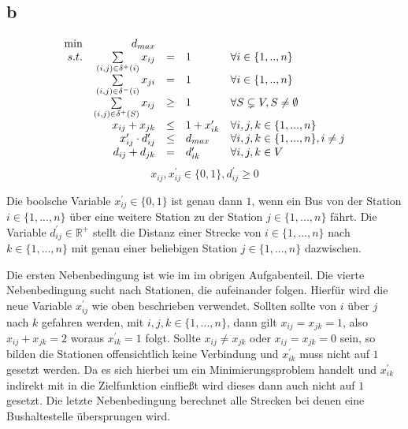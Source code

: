 \documentclass[10pt]{article}
\begin{document}
    \subsection*{b}
      \begin{displaymath}
        \begin{array}{ r r c l l }
          \min & d_{max} & & & \\
          s.t. & \sum\limits_{(i,j)\in \delta^{+}(i)} x_{ij} & = & 1 & \forall 
            i\in \{1,..,n\}\\
               & \sum\limits_{(i,j)\in \delta^{-}(i)} x_{ji} & = & 1 & \forall 
            i\in \{1,..,n\}\\
            & \sum\limits_{(i,j)\in \delta^{+}(S)} x_{ij} & \geq &  1 & \forall
            S\subsetneq V, S\neq \emptyset \\
            & x_{ij} + x_{jk} & \leq &1 + x_{ik}^{\prime} & \forall
                i,j,k \in \{1,...,n\} \\
            & x_{ij}^{\prime}\cdot d_{ij}^{\prime} &\leq&
              d_{max} & \forall i,j,k \in \{1,...,n\}, i\neq j \\
            & d_{ij} + d_{jk} &=& d^{\prime}_{ik} & \forall i,j,k\in V
        \end{array}
      \end{displaymath}
      \begin{displaymath}
        x_{ij},x_{ij}^{\prime}\in\{0,1\}, d_{ij}^{\prime} \geq 0
      \end{displaymath}

      Die boolsche Variable $x_{ij}^{\prime} \in \{0,1\}$ ist genau dann $1$,
      wenn ein Bus von der Station $i \in \{1,...,n\}$ über eine weitere Station 
      zu der Station $j\in \{1,...,n\}$ fährt. Die Variable $d_{ij}^{\prime} \in
      \mathbb{R}^{+}$ stellt die Distanz einer Strecke von $i \in \{1,...,n\}$
      nach $k\in\{1,...,n\}$ mit genau einer beliebigen Station $j\in
      \{1,...,n\}$ dazwischen. 

      Die ersten Nebenbedingung ist wie im im obrigen Aufgabenteil. 
      Die vierte
      Nebenbedingung sucht nach Stationen, die aufeinander folgen. Hierfür wird
      die neue Variable $x_{ij}^{\prime}$ wie oben beschrieben verwendet.
      Sollten sollte von $i$ über $j$ nach $k$ gefahren werden, mit
      $i,j,k\in\{1,...,n\}$, dann gilt $x_{ij}=x_{jk}=1$, also $x_{ij}+x_{jk}=2$
      woraus $x_{ik}^{\prime}=1$ folgt. Sollte $x_{ij} \neq x_{jk}$ oder
      $x_{ij}=x_{jk}=0$ sein, so bilden die Stationen offensichtlich keine
      Verbindung und $x_{ik}^{\prime}$ muss nicht auf $1$ gesetzt werden. Da es
      sich hierbei um ein Minimierungsproblem handelt und $x_{ik}^{\prime}$
      indirekt mit in die Zielfunktion einfließt wird dieses dann auch nicht auf
      $1$ gesetzt.
      Die letzte Nebenbedingung berechnet alle Strecken bei denen eine
      Bushaltestelle übersprungen wird.
\end{document}
